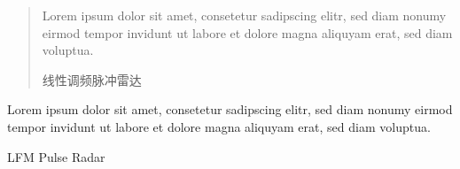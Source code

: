 \documentclass[../main]{subfiles}
\begin{document}
\begin{abstract}
  Lorem ipsum dolor sit amet, consetetur sadipscing elitr, sed diam nonumy eirmod tempor invidunt ut labore et dolore magna aliquyam erat, sed diam voluptua.
  \cite{李云冲2007雷达仿真系统的设计,王洪锋2002雷达仿真平台的设计,张敏2006通用雷达仿真系统模型的研究与探讨}
  \begin{keyword}
    线性调频脉冲雷达
  \end{keyword}
\end{abstract}

\begin{abstract*}
  Lorem ipsum dolor sit amet, consetetur sadipscing elitr, sed diam nonumy eirmod tempor invidunt ut labore et dolore magna aliquyam erat, sed diam voluptua.
  \begin{keyword*}
    LFM Pulse Radar
  \end{keyword*}
\end{abstract*}
\end{document}
